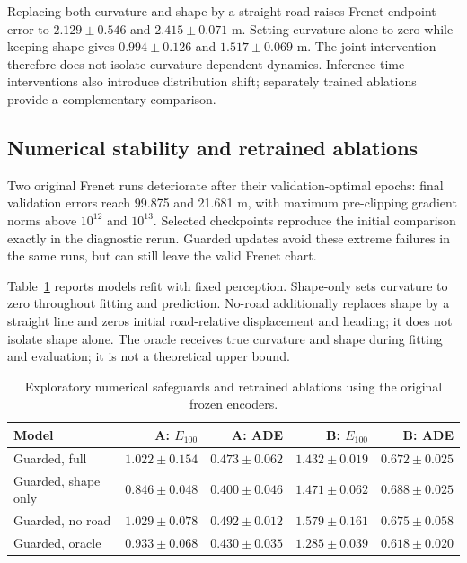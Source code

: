 \documentclass[preprint,12pt]{elsarticle}
\begin{document}
Replacing both curvature and shape by a straight road raises Frenet endpoint
error to $2.129\pm0.546$ and $2.415\pm0.071$ m. Setting curvature alone to zero
while keeping shape gives $0.994\pm0.126$ and $1.517\pm0.069$ m. The joint
intervention therefore does not isolate curvature-dependent dynamics.
Inference-time interventions also introduce distribution shift; separately
trained ablations provide a complementary comparison.

\subsection{Numerical stability and retrained ablations}
Two original Frenet runs deteriorate after their validation-optimal epochs:
final validation errors reach 99.875 and 21.681 m, with maximum pre-clipping
gradient norms above $10^{12}$ and $10^{13}$. Selected checkpoints reproduce the
initial comparison exactly in the diagnostic rerun. Guarded updates avoid these
extreme failures in the same runs, but can still leave the valid Frenet chart.

Table~\ref{tab:guards} reports models refit with fixed perception. Shape-only
sets curvature to zero throughout fitting and prediction. No-road additionally
replaces shape by a straight line and zeros initial road-relative displacement
and heading; it does not isolate shape alone. The oracle receives true curvature
and shape during fitting and evaluation; it is not a theoretical upper bound.
\begin{table}[t]
\centering
\caption{Exploratory numerical safeguards and retrained ablations using the original frozen encoders.}
\label{tab:guards}
\footnotesize
\setlength{\tabcolsep}{3pt}
\begin{tabular}{lrrrr}
\toprule
Model & A: $E_{100}$ & A: ADE & B: $E_{100}$ & B: ADE \\
\midrule
Guarded, full & $1.022 \pm 0.154$ & $0.473 \pm 0.062$ & $1.432 \pm 0.019$ & $0.672 \pm 0.025$ \\
Guarded, shape only & $0.846 \pm 0.048$ & $0.400 \pm 0.046$ & $1.471 \pm 0.062$ & $0.688 \pm 0.025$ \\
Guarded, no road & $1.029 \pm 0.078$ & $0.492 \pm 0.012$ & $1.579 \pm 0.161$ & $0.675 \pm 0.058$ \\
Guarded, oracle & $0.933 \pm 0.068$ & $0.430 \pm 0.035$ & $1.285 \pm 0.039$ & $0.618 \pm 0.020$ \\
\bottomrule
\end{tabular}
\end{table}
\end{document}
